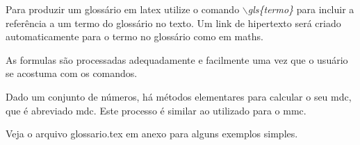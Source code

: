 Para produzir um glossário em \Gls{latex} utilize o comando \emph{$\backslash$gls\{termo\}} para incluir a referência a um termo do glossário no texto. Um link de hipertexto será criado automaticamente para o termo no glossário como em \gls{maths}. 

As \glspl{formula} são processadas adequadamente e facilmente uma vez que o usuário se acostuma com os comandos. 
 
Dado um conjunto de números, há métodos elementares para calcular o seu \acrlong{mdc}, que é abreviado \acrshort{mdc}. Este processo é similar ao utilizado para o  \acrfull{mmc}.

Veja o arquivo glossario.tex em anexo para alguns exemplos simples.
